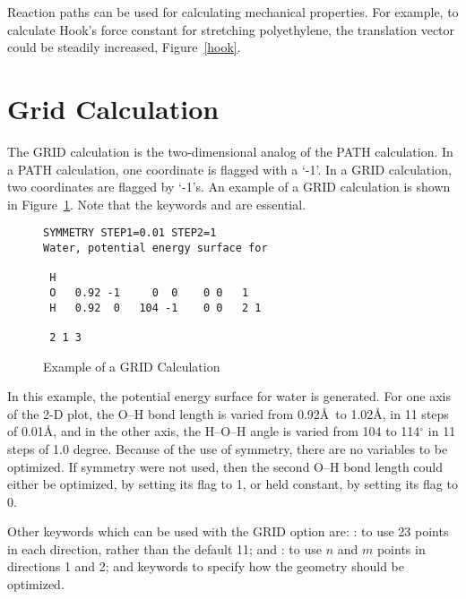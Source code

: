 Reaction paths can be used for calculating mechanical properties.  For example,
to calculate Hook's force constant for stretching polyethylene, the translation
vector could be steadily increased, Figure~\ref{hook}.

\section{Grid Calculation}
\label{grid}
The GRID calculation is the two-dimensional analog of the PATH calculation.  In
a PATH calculation, one coordinate is flagged with a `-1'.  In a GRID
calculation, two coordinates are flagged by `-1's.  An example of a  GRID
calculation is shown in Figure~\ref{exgrid}. Note that the keywords
 and  are essential.

\begin{figure}
\begin{makeimage}
\end{makeimage}
\begin{verbatim}
SYMMETRY STEP1=0.01 STEP2=1
Water, potential energy surface for

 H
 O   0.92 -1     0  0    0 0   1
 H   0.92  0   104 -1    0 0   2 1

 2 1 3
\end{verbatim} 
\caption{\label{exgrid} Example of a GRID Calculation}
\end{figure}

In this example, the potential energy surface for water is generated.  For one
axis of the 2-D plot, the O--H bond length is varied from 0.92\AA\ to 1.02\AA ,  in 11 steps of 0.01\AA , and in the other axis, the H--O--H angle is varied
from 104  to 114$^{\circ}$ in 11 steps of 1.0 degree.  Because of the use of
symmetry, there are no variables to be optimized.  If symmetry were not used,
then the second O--H bond length could either be optimized, by setting its flag
to 1, or held constant, by setting its flag to 0.  

Other keywords which can be used with the GRID option are: : to use
23 points in each direction, rather than the default 11;  and
: to use $n$ and $m$ points in directions 1 and 2; and keywords
to specify how the geometry should be optimized.
